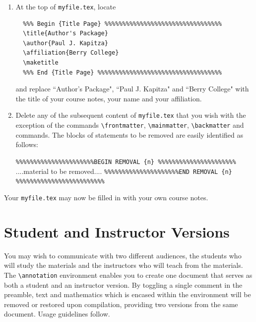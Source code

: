 \begin{enumerate}

 \item At the top of \texttt{myfile.tex}, locate
       \begin{verbatim}
  %%% Begin {Title Page} %%%%%%%%%%%%%%%%%%%%%%%%%%%%%%%%%
  \title{Author's Package}
  \author{Paul J. Kapitza}
  \affiliation{Berry College}
  \maketitle
  %%% End {Title Page} %%%%%%%%%%%%%%%%%%%%%%%%%%%%%%%%%%%
 \end{verbatim}
 and replace ``Author's Package", ``Paul J. Kapitza" and ``Berry
 College" with the title of your course notes, your name and your
 affiliation.

 \item Delete any of the subsequent content of \texttt{myfile.tex} that you wish with
       the exception of the commands \verb|\frontmatter|,
       \verb|\mainmatter|, \verb|\backmatter| and
       \verb|| commands. The blocks of statements
       to be removed are easily identified as follows:
       \begin{center}
        \verb|%%%%%%%%%%%%%%%%%%%%%%BEGIN REMOVAL {n} %%%%%%%%%%%%%%%%%%%%%%|
        ....material to be removed....
        \verb|%%%%%%%%%%%%%%%%%%%%%END REMOVAL {n} %%%%%%%%%%%%%%%%%%%%%%%%%|
       \end{center}

\end{enumerate}

Your \texttt{myfile.tex} may now be filled in with your own course notes.

\section{Student and Instructor Versions}\label{ch:annotation}

You may wish to communicate with two different audiences, the students who
will study the materials and the instructors who will teach from the materials.
The \verb|\annotation| environment enables you to create one document that serves
as both a student and an instructor version.  By toggling a single comment in the preamble,
text and mathematics which is encased within the environment will be removed or restored
upon compilation, providing two versions from the same document.  Usage guidelines follow.

